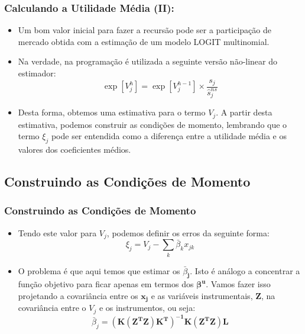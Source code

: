 \documentclass{beamer}
\begin{document}
\begin{frame}\frametitle{Calculando a Utilidade Média (II):}

\begin{itemize}
\item Um bom valor inicial para fazer a recursão pode ser a participação
de mercado obtida com a estimação de um modelo LOGIT multinomial. 
\item Na verdade, na programação é utilizada a seguinte versão não-linear
do estimador:
\[
\exp[V_{j}^{h}]=\exp[V_{j}^{h-1}]\times\frac{s_{j}}{\hat{s}_{j}^{ns}}
\]
\item Desta forma, obtemos uma estimativa para o termo $V_{j}$. A partir
desta estimativa, podemos construir as condições de momento, lembrando
que o termo $\xi_{j}$ pode ser entendida como a diferença entre a
utilidade média e os valores dos coeficientes médios. 
\end{itemize}
\end{frame}

\subsection{Construindo as Condições de Momento}
\begin{frame}\frametitle{Construindo as Condições de Momento}

\begin{itemize}
\item Tendo este valor para $V_{j}$, podemos definir os erros da seguinte
forma:
\[
\xi_{j}=V_{j}-\sum_{k}\bar{\beta}_{k}x_{jk}
\]
%
\item O problema é que aqui temos que estimar os $\bar{\beta}_{\mathbf{j}}$.
Isto é análogo a concentrar a função objetivo para ficar apenas em
termos dos $\mathbf{\beta^{u}}$. Vamos fazer isso projetando a covariância
entre os $\mathbf{x_{j}}$ e as variáveis instrumentais, $\mathbf{Z}$,
na covariância entre o $V_{j}$ e os instrumentos, ou seja:
\[
\bar{\beta}_{j}=\mathbf{(K(Z^{T}Z)K^{T})^{-1}K(Z^{T}Z)L}
\]
\end{itemize}
%


\end{frame}
\end{document}
